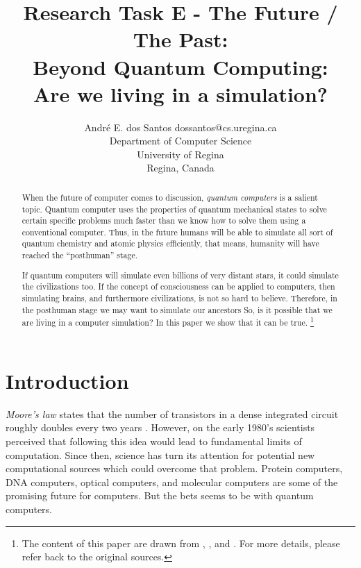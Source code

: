 \documentclass[twoside,11pt]{article}
\begin{document}
\title{Research Task E - The Future / The Past: \\ Beyond Quantum Computing: \\Are we living in a simulation?}

\author{\name André E. dos Santos \email dossantos@cs.uregina.ca \\
\addr Department of Computer Science \\
University of Regina \\ 
Regina, Canada
}



\maketitle

\begin{abstract}%
When the future of computer comes to discussion, \emph{quantum computers} is a salient topic.
Quantum computer uses the properties of quantum mechanical states to solve certain specific problems much faster than we know how to solve them using a conventional computer.
Thus, in the future humans will be able to simulate all sort of quantum chemistry and atomic physics efficiently, that means, humanity will have reached the ``posthuman'' stage.

If quantum computers will simulate even billions of very distant stars, it could simulate the civilizations too.
If the concept of consciousness can be applied to computers, then simulating brains, and furthermore civilizations, is not so hard to believe. 
Therefore, in the posthuman stage we may want to simulate our ancestors
So, is it possible that we are living in a computer simulation?
In this paper we show that it can be true.
\footnote{
The content of this paper are drawn from \citep{thedg}, \citep{scott16}, and \citep{bostrom2003we}.
For more details, please refer back to the original sources.
}
\end{abstract}


\section{Introduction}
\label{sec:intro}



\emph{Moore's law} states that the number of transistors in a dense integrated circuit roughly doubles every two years \citep{schaller1997moore}.
However, on the early 1980's scientists perceived that following this idea would lead to fundamental limits of computation.
Since then, science has turn its attention for potential new computational sources which could overcome that problem.
Protein computers, DNA computers, optical computers, and molecular computers are some of the promising future for computers.
But the bets seems to be with quantum computers.
\end{document}

